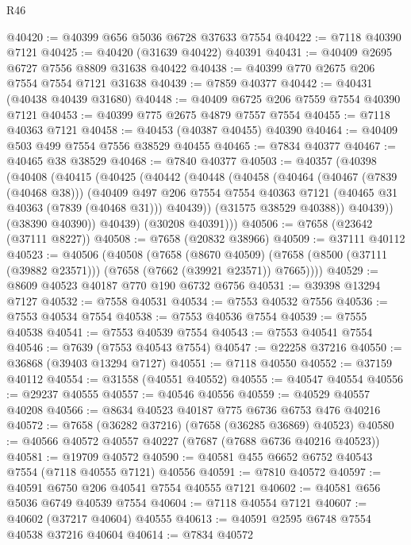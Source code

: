 \begin{lexlean}{R46}
\begin{coremodule}
@40420 := @40399 @656 @5036 @6728 @37633 @7554
@40422 := @7118 @40390 @7121
@40425 := @40420 (@31639 @40422) @40391
@40431 := @40409 @2695 @6727 @7556 @8809 @31638 @40422
@40438 := @40399 @770 @2675 @206 @7554 @7554 @7121 @31638
@40439 := @7859 @40377
@40442 := @40431 (@40438 @40439 @31680)
@40448 := @40409 @6725 @206 @7559 @7554 @40390 @7121
@40453 := @40399 @775 @2675 @4879 @7557 @7554
@40455 := @7118 @40363 @7121
@40458 := @40453 (@40387 @40455) @40390
@40464 := @40409 @503 @499 @7554 @7556 @38529 @40455
@40465 := @7834 @40377
@40467 := @40465 @38 @38529
@40468 := @7840 @40377
@40503 := @40357
    (@40398
      (@40408
        (@40415
          (@40425
            (@40442
              (@40448
                (@40458
                  (@40464
                    (@40467 (@7839 (@40468 @38)))
                    (@40409
                      @497
                      @206
                      @7554
                      @7554
                      @40363
                      @7121
                      (@40465 @31 @40363 (@7839 (@40468 @31)))
                      @40439))
                  (@31575 @38529 @40388))
                @40439))
            (@38390 @40390))
          @40439)
        (@30208 @40391)))
@40506 := @7658 (@23642 (@37111 @8227))
@40508 := @7658 (@20832 @38966)
@40509 := @37111 @40112
@40523 := @40506
    (@40508
      (@7658
        (@8670 @40509)
        (@7658 (@8500 (@37111 (@39882 @23571))) (@7658 (@7662 (@39921 @23571)) @7665))))
@40529 := @8609 @40523 @40187 @770 @190 @6732 @6756
@40531 := @39398 @13294 @7127
@40532 := @7558 @40531
@40534 := @7553 @40532 @7556
@40536 := @7553 @40534 @7554
@40538 := @7553 @40536 @7554
@40539 := @7555 @40538
@40541 := @7553 @40539 @7554
@40543 := @7553 @40541 @7554
@40546 := @7639 (@7553 @40543 @7554)
@40547 := @22258 @37216
@40550 := @36868 (@39403 @13294 @7127)
@40551 := @7118 @40550
@40552 := @37159 @40112
@40554 := @31558 (@40551 @40552)
@40555 := @40547 @40554
@40556 := @29237 @40555
@40557 := @40546 @40556
@40559 := @40529 @40557 @40208
@40566 := @8634 @40523 @40187 @775 @6736 @6753 @476 @40216
@40572 := @7658 (@36282 @37216) (@7658 (@36285 @36869) @40523)
@40580 := @40566 @40572 @40557 @40227 (@7687 (@7688 @6736 @40216 @40523))
@40581 := @19709 @40572
@40590 := @40581 @455 @6652 @6752 @40543 @7554 (@7118 @40555 @7121) @40556
@40591 := @7810 @40572
@40597 := @40591 @6750 @206 @40541 @7554 @40555 @7121
@40602 := @40581 @656 @5036 @6749 @40539 @7554
@40604 := @7118 @40554 @7121
@40607 := @40602 (@37217 @40604) @40555
@40613 := @40591 @2595 @6748 @7554 @40538 @37216 @40604
@40614 := @7834 @40572

\end{coremodule}
\end{lexlean}
